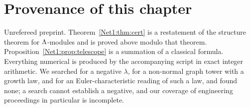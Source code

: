 \section*{Provenance of this chapter}

Unrefereed preprint. Theorem~\ref{Net1:thm:cert} is a restatement of the structure theorem for
$\Lambda$-modules and is proved above modulo that theorem. Proposition~\ref{Net1:prop:telescope} is
a summation of a classical formula. Everything numerical is produced by the accompanying
script in exact integer arithmetic. We searched for a negative $\lambda$, for a non-normal
graph tower with a growth law, and for an Euler-characteristic reading of such a law, and
found none; a search cannot establish a negative, and our coverage of engineering
proceedings in particular is incomplete.
